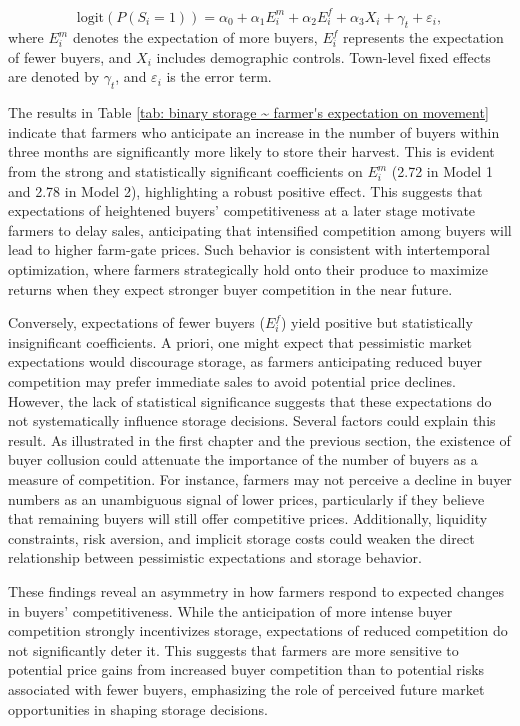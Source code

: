 \documentclass[12pt]{article}
\begin{document}
\begin{equation}
    \text{logit} \left( P(S_i = 1) \right) = \alpha_0 + \alpha_1 E^m_i + \alpha_2 E^f_i + \alpha_3 X_i + \gamma_t + \varepsilon_i,
\end{equation}
where $E^m_i$ denotes the expectation of more buyers, $E^f_i$ represents the expectation of fewer buyers, and $X_i$ includes demographic controls. Town-level fixed effects are denoted by $\gamma_t$, and $\varepsilon_i$ is the error term.





The results in Table \ref{tab: binary storage ~ farmer's expectation on movement} indicate that farmers who anticipate an increase in the number of buyers within three months are significantly more likely to store their harvest. This is evident from the strong and statistically significant coefficients on $E^m_i$ (2.72 in Model 1 and 2.78 in Model 2), highlighting a robust positive effect. This suggests that expectations of heightened buyers' competitiveness at a later stage motivate farmers to delay sales, anticipating that intensified competition among buyers will lead to higher farm-gate prices. Such behavior is consistent with intertemporal optimization, where farmers strategically hold onto their produce to maximize returns when they expect stronger buyer competition in the near future.  

Conversely, expectations of fewer buyers ($E^f_i$) yield positive but statistically insignificant coefficients. A priori, one might expect that pessimistic market expectations would discourage storage, as farmers anticipating reduced buyer competition may prefer immediate sales to avoid potential price declines. However, the lack of statistical significance suggests that these expectations do not systematically influence storage decisions. Several factors could explain this result. As illustrated in the first chapter and the previous section, the existence of buyer collusion could attenuate the importance of the number of buyers as a measure of competition. For instance, farmers may not perceive a decline in buyer numbers as an unambiguous signal of lower prices, particularly if they believe that remaining buyers will still offer competitive prices. Additionally, liquidity constraints, risk aversion, and implicit storage costs could weaken the direct relationship between pessimistic expectations and storage behavior.  

These findings reveal an asymmetry in how farmers respond to expected changes in buyers' competitiveness. While the anticipation of more intense buyer competition strongly incentivizes storage, expectations of reduced competition do not significantly deter it. This suggests that farmers are more sensitive to potential price gains from increased buyer competition than to potential risks associated with fewer buyers, emphasizing the role of perceived future market opportunities in shaping storage decisions.
\end{document}
